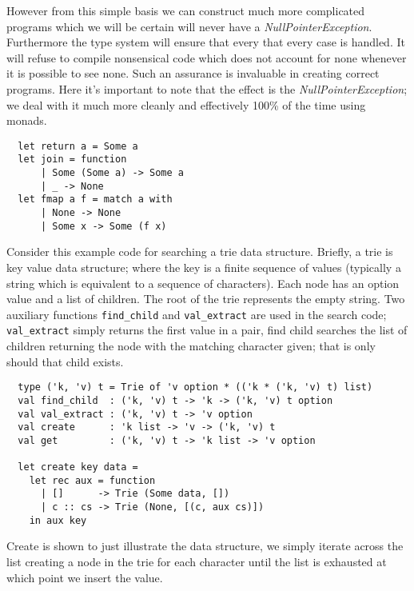However from this simple basis we can construct much more complicated programs which we
will be certain will never have a \textit{NullPointerException}.
Furthermore the type system will ensure that every that
every case is handled.
It will refuse to compile nonsensical code
which does not account for none whenever it is possible to see none.
Such an assurance is invaluable in creating correct programs.
Here it's important to note that the effect is the \textit{NullPointerException};
we deal with it much more cleanly and effectively 100\% of the time using monads.

\begin{verbatim}
  let return a = Some a
  let join = function
      | Some (Some a) -> Some a
      | _ -> None
  let fmap a f = match a with
      | None -> None
      | Some x -> Some (f x)
\end{verbatim}

Consider this example code for searching a trie data structure.
Briefly, a trie is key value data structure;
where the key is a finite sequence of values
(typically a string which is equivalent to a sequence of characters).
Each node has an option value and a list of children.
The root of the trie represents the empty string.
Two auxiliary functions \texttt{find\_child} and \texttt{val\_extract}
are used in the search code; \texttt{val\_extract}
simply returns the first value in a pair,
find child searches the list of children returning
the node with the matching character given;
that is only should that child exists.

\begin{verbatim}
  type ('k, 'v) t = Trie of 'v option * (('k * ('k, 'v) t) list)
  val find_child  : ('k, 'v) t -> 'k -> ('k, 'v) t option
  val val_extract : ('k, 'v) t -> 'v option
  val create      : 'k list -> 'v -> ('k, 'v) t
  val get         : ('k, 'v) t -> 'k list -> 'v option

  let create key data =
    let rec aux = function
      | []      -> Trie (Some data, [])
      | c :: cs -> Trie (None, [(c, aux cs)])
    in aux key
\end{verbatim}

Create is shown to just illustrate the data structure,
we simply iterate across the list creating a node in the trie for each character
until the list is exhausted at which point we insert the value.

